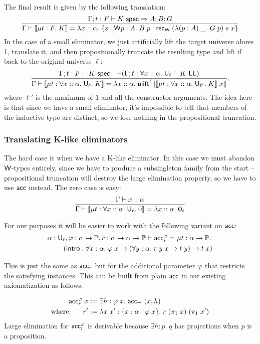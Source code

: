 The final result is given by the following translation:
$$\frac{\Gamma;t:F\vdash K\spec\Rightarrow A;B;G}
{\Gamma\vdash\scott{\mu t:F.\;K}=\lambda x::\alpha.\;\{s:\W p:A.\;B\;p\mid \rec_\W\;(\lambda (p:A)\; \_.\;G\;p)\;s\;x\}}$$
In the case of a small eliminator, we just artificially lift the target universe above 1, translate it, and then propositionally truncate the resulting type and lift if back to the original universe $\ell$:
$$\frac{\Gamma;t:F\vdash K\spec\quad \neg(\Gamma;t:\forall x::\alpha.\;\U_\ell\vdash K\LE)}
{\Gamma\vdash\scott{\mu t:\forall x::\alpha.\;\U_\ell.\;K}=\lambda x::\alpha.\;\ulift^\ell\|\scott{\mu t:\forall x::\alpha.\;\U_{\ell'}.\;K}\;x\|},$$
where $\ell'$ is the maximum of $1$ and all the constructor arguments. The idea here is that since we have a small eliminator, it's impossible to tell that members of the inductive type are distinct, so we lose nothing in the propositional truncation.

\subsubsection{Translating K-like eliminators}
The hard case is when we have a K-like eliminator. In this case we must abandon $\mathsf{W}$-types entirely, since we have to produce a subsingleton family from the start -- propositional truncation will destroy the large elimination property, so we have to use $\mathsf{acc}$ instead. The zero case is easy:
$$\frac{\Gamma\vdash x::\alpha}
{\Gamma\vdash\scott{\mu t:\forall x::\alpha.\;\U_\ell.\;0}=\lambda x::\alpha.\;{\bf 0}_\ell}$$

For our purposes it will be easier to work with the following variant on $\mathsf{acc}$:
\begin{align*}
&\alpha:\mathsf{U}_\ell,\varphi:\alpha\to\mathbb{P},r:\alpha\to\alpha\to\mathbb{P}\vdash\mathsf{acc}^\varphi_r=\mu t:\alpha\to\mathbb{P}.\\
&\qquad\;(\mathsf{intro}:\forall x:\alpha.\;\varphi\;x\to(\forall y:\alpha.\;r\;y\;x\to t\;y)\to t\;x)
\end{align*}

This is just the same as $\mathsf{acc}_r$ but for the additional parameter $\varphi$ that restricts the satisfying instances. This can be built from plain $\mathsf{acc}$ in our existing axiomatization as follows:

\begin{align*}
\mathsf{acc}^\varphi_r\;x&:=\exists h:\varphi\;x.\;\mathsf{acc}_{r'}\;(x,h)\\
\mbox{where}\qquad r'&:=\lambda x\;x':\{x:\alpha\mid \varphi\;x\}.\;r\;(\pi_1\;x)\;(\pi_1\;x')
\end{align*}
Large elimination for $\mathsf{acc}^\varphi_r$ is derivable because $\exists h:p.\;q$ has projections when $p$ is a proposition.

